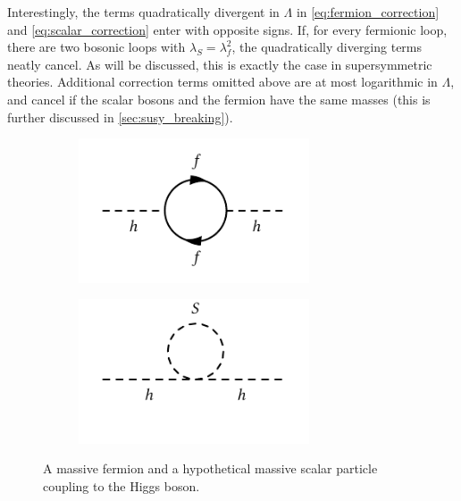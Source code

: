 Interestingly, the terms quadratically divergent in $\Lambda$ in \cref{eq:fermion_correction} and \cref{eq:scalar_correction} enter with opposite signs. If, for every fermionic loop, there are two bosonic loops with $\lambda_S = \lambda_f^2$, the quadratically diverging terms neatly cancel. As will be discussed, this is exactly the case in supersymmetric theories. Additional correction terms omitted above are at most logarithmic in $\Lambda$, and cancel if the scalar bosons and the fermion have the same masses (this is further discussed in \cref{sec:susy_breaking}).

\begin{figure}
	\centering
	\begin{subfigure}[b]{0.5\linewidth}
		\centering\includegraphics[width=0.75\textwidth]{fermion_loop}
		\caption{\label{fig:fermion_loop}}
	\end{subfigure}%
	\begin{subfigure}[b]{0.5\linewidth}
		\centering\includegraphics[width=0.75\textwidth]{scalar_loop}
		\caption{\label{fig:scal_loop}}
	\end{subfigure}	
	\caption{A massive fermion  and a hypothetical massive scalar particle  coupling to the Higgs boson.}\label{fig:loop_corrections_higgs}
\end{figure}

